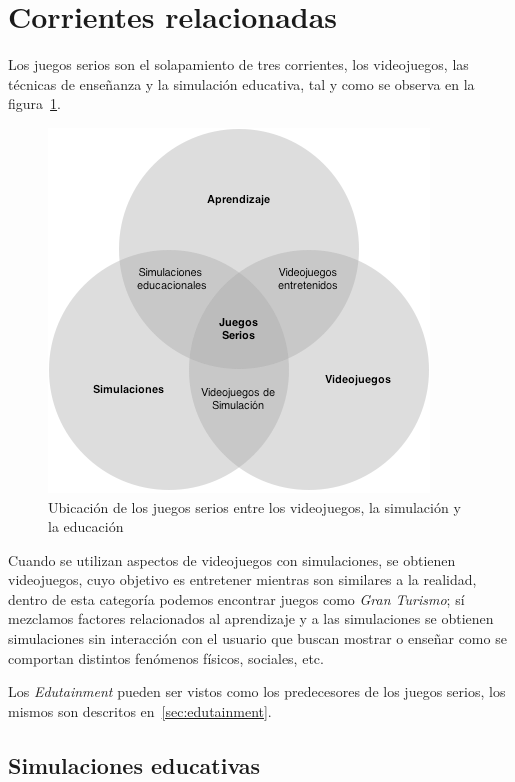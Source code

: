 \section{Corrientes relacionadas}

Los juegos serios son el solapamiento de tres corrientes, los videojuegos, las
técnicas de enseñanza y la simulación educativa\cite{education:games}, tal y
como se observa en la figura~\ref{fig:corrientes_relacionadas}. 

\begin{figure}[ht]
\centering
\includegraphics[scale=0.7]{juegos_serios/corrientes_paralelas.png}
\caption{Ubicación de los juegos serios entre los videojuegos, la simulación y
    la educación}
\label{fig:corrientes_relacionadas}
\end{figure}

Cuando se utilizan aspectos de videojuegos con simulaciones, se obtienen videojuegos,
cuyo objetivo es entretener mientras son similares a la realidad, dentro de esta
categoría podemos encontrar juegos como \emph{Gran Turismo}; sí mezclamos
factores relacionados al aprendizaje y a las simulaciones se obtienen
simulaciones sin interacción con el usuario que buscan mostrar o enseñar como se
comportan distintos fenómenos físicos, sociales, etc.


Los \emph{Edutainment} pueden ser vistos como los predecesores de los juegos
serios, los mismos son descritos en~\ref{sec:edutainment}.

\subsection{Simulaciones educativas}


